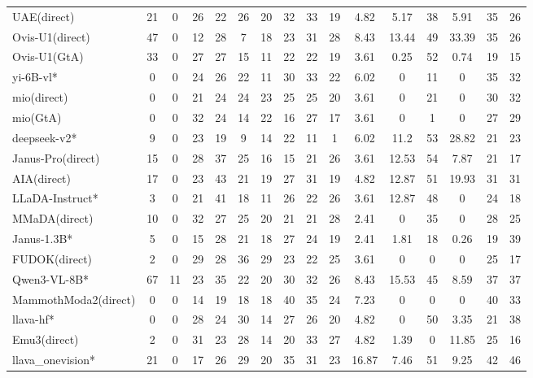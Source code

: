 \documentclass{article}
\providecommand{\rowcolor}[1]{}
\theoremstyle{plain}
\theoremstyle{definition}
\theoremstyle{remark}
\begin{document}
\begin{table}[!htbp]
{\begin{tabular}{@{}lccccccccccccccc@{}}
UAE(direct) & 21 & 0 & 26 & 22 & 26 & 20 & 32 & 33 & 19 & 4.82 & 5.17 & 38 & 5.91 & 35 & 26 \\
Ovis-U1(direct) & 47 & 0 & 12 & 28 & 7 & 18 & 23 & 31 & 28 & 8.43 & 13.44 & 49 & 33.39 & 35 & 26 \\
Ovis-U1(GtA) & 33 & 0 & 27 & 27 & 15 & 11 & 22 & 22 & 19 & 3.61 & 0.25 & 52 & 0.74 & 19 & 15 \\
\midrule
\rowcolor{gray!12}
yi-6B-vl* & 0 & 0 & 24 & 26 & 22 & 11 & 30 & 33 & 22 & 6.02 & 0 & 11 & 0 & 35 & 32 \\
mio(direct) & 0 & 0 & 21 & 24 & 24 & 23 & 25 & 25 & 20 & 3.61 & 0 & 21 & 0 & 30 & 32 \\
mio(GtA) & 0 & 0 & 32 & 24 & 14 & 22 & 16 & 27 & 17 & 3.61 & 0 & 1 & 0 & 27 & 29 \\
\midrule
\rowcolor{gray!12}
deepseek-v2* & 9 & 0 & 23 & 19 & 9 & 14 & 22 & 11 & 1 & 6.02 & 11.2 & 53 & 28.82 & 21 & 23 \\
Janus-Pro(direct) & 15 & 0 & 28 & 37 & 25 & 16 & 15 & 21 & 26 & 3.61 & 12.53 & 54 & 7.87 & 21 & 17 \\
AIA(direct) & 17 & 0 & 23 & 43 & 21 & 19 & 27 & 31 & 19 & 4.82 & 12.87 & 51 & 19.93 & 31 & 31 \\
\midrule
\rowcolor{gray!12}
LLaDA-Instruct* & 3 & 0 & 21 & 41 & 18 & 11 & 26 & 22 & 26 & 3.61 & 12.87 & 48 & 0 & 24 & 18 \\
MMaDA(direct) & 10 & 0 & 32 & 27 & 25 & 20 & 21 & 21 & 28 & 2.41 & 0 & 35 & 0 & 28 & 25 \\
\midrule
\rowcolor{gray!12}
Janus-1.3B* & 5 & 0 & 15 & 28 & 21 & 18 & 27 & 24 & 19 & 2.41 & 1.81 & 18 & 0.26 & 19 & 39 \\
FUDOK(direct) & 2 & 0 & 29 & 28 & 36 & 29 & 23 & 22 & 25 & 3.61 & 0 & 0 & 0 & 25 & 17 \\
\midrule
\rowcolor{gray!12}
Qwen3-VL-8B* & 67 & 11 & 23 & 35 & 22 & 20 & 30 & 32 & 26 & 8.43 & 15.53 & 45 & 8.59 & 37 & 37 \\
MammothModa2(direct) & 0 & 0 & 14 & 19 & 18 & 18 & 40 & 35 & 24 & 7.23 & 0 & 0 & 0 & 40 & 33 \\
\midrule
\rowcolor{gray!12}
llava-hf* & 0 & 0 & 28 & 24 & 30 & 14 & 27 & 26 & 20 & 4.82 & 0 & 50 & 3.35 & 21 & 38 \\
Emu3(direct) & 2 & 0 & 31 & 23 & 28 & 14 & 20 & 33 & 27 & 4.82 & 1.39 & 0 & 11.85 & 25 & 16 \\
\midrule
\rowcolor{gray!12}
llava\_onevision* & 21 & 0 & 17 & 26 & 29 & 20 & 35 & 31 & 23 & 16.87 & 7.46 & 51 & 9.25 & 42 & 46 \\

\end{tabular}}
\end{table}
\end{document}
